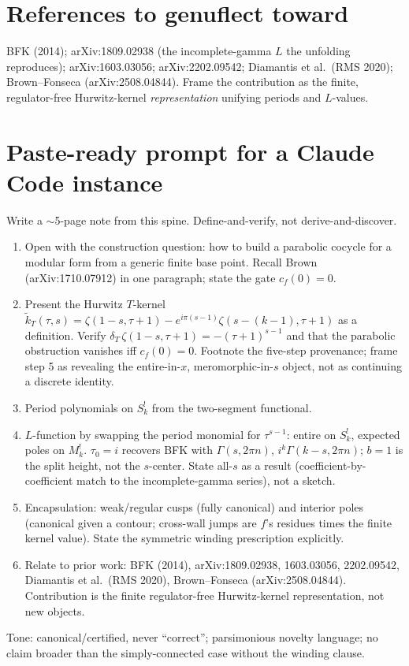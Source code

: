 \documentclass[11pt]{article}
\newcommand{\tk}{\widetilde{k}_T}
\begin{document}
\section*{References to genuflect toward}

BFK (2014); arXiv:1809.02938 (the incomplete-gamma $L$ the unfolding reproduces);
arXiv:1603.03056; arXiv:2202.09542; Diamantis et al.\ (RMS 2020); Brown--Fonseca
(arXiv:2508.04844). Frame the contribution as the finite, regulator-free
Hurwitz-kernel \emph{representation} unifying periods and $L$-values.

\section*{Paste-ready prompt for a Claude Code instance}

\begin{promptbox}
\small
Write a $\sim$5-page note from this spine. Define-and-verify, not derive-and-discover.
\begin{enumerate}[leftmargin=1.4em,topsep=1pt,itemsep=1pt,nosep]
\item Open with the construction question: how to build a parabolic cocycle for a
modular form from a generic finite base point. Recall Brown (arXiv:1710.07912) in one
paragraph; state the gate $c_f(0)=0$.
\item Present the Hurwitz $T$-kernel
$\tk(\tau,s)=\zeta(1-s,\tau+1)-e^{i\pi(s-1)}\zeta(s-(k-1),\tau+1)$ as a definition.
Verify $\delta_T\,\zeta(1-s,\tau+1)=-(\tau+1)^{s-1}$ and that the parabolic obstruction
vanishes iff $c_f(0)=0$. Footnote the five-step provenance; frame step 5 as revealing
the entire-in-$x$, meromorphic-in-$s$ object, not as continuing a discrete identity.
\item Period polynomials on $S_k^!$ from the two-segment functional.
\item $L$-function by swapping the period monomial for $\tau^{s-1}$: entire on $S_k^!$,
expected poles on $M_k^!$. $\tau_0=i$ recovers BFK with $\Gamma(s,2\pi n)$,
$i^k\Gamma(k-s,2\pi n)$; $b=1$ is the split height, not the $s$-center. State all-$s$
as a result (coefficient-by-coefficient match to the incomplete-gamma series), not a
sketch.
\item Encapsulation: weak/regular cusps (fully canonical) and interior poles
(canonical given a contour; cross-wall jumps are $f$'s residues times the finite
kernel value). State the symmetric winding prescription explicitly.
\item Relate to prior work: BFK (2014), arXiv:1809.02938, 1603.03056, 2202.09542,
Diamantis et al.\ (RMS 2020), Brown--Fonseca (arXiv:2508.04844). Contribution is the
finite regulator-free Hurwitz-kernel representation, not new objects.
\end{enumerate}
Tone: canonical/certified, never ``correct''; parsimonious novelty language; no claim
broader than the simply-connected case without the winding clause.
\end{promptbox}
\end{document}
